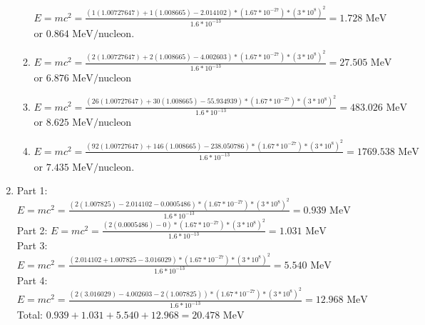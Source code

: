 \documentclass{article}
\begin{document}
\begin{enumerate}
\begin{enumerate}
        $E=mc^2 = \frac{(1(1.00727647)+1(1.008665)-2.014102)*(1.67*10^{-27})*(3*10^8)^2}{1.6*10^{-13}} = 1.728 \text{ MeV}$ or $0.864\text{ MeV}/$nucleon.
        
        \item
        
        $E=mc^2 = \frac{(2(1.00727647)+2(1.008665)-4.002603)*(1.67*10^{-27})*(3*10^8)^2}{1.6*10^{-13}} = 27.505\text{ MeV}$ or $6.876\text{ MeV}/$nucleon
        
        \item
        
        $E=mc^2 = \frac{(26(1.00727647)+30(1.008665)-55.934939)*(1.67*10^{-27})*(3*10^8)^2}{1.6*10^{-13}} = 483.026\text{ MeV}$ or $8.625\text{ MeV}/$nucleon
        
        \item
        
        $E=mc^2 = \frac{(92(1.00727647)+146(1.008665)-238.050786)*(1.67*10^{-27})*(3*10^8)^2}{1.6*10^{-13}} = 1769.538\text{ MeV}$ or $7.435\text{ MeV}/$nucleon.
        
    \end{enumerate}
    
    \item
    
    Part 1: $E=mc^2 = \frac{(2(1.007825)-2.014102-0.0005486)*(1.67*10^{-27})*(3*10^8)^2}{1.6*10^{-13}} = 0.939\text{ MeV}$\\
    Part 2: $E=mc^2 = \frac{(2(0.0005486)-0)*(1.67*10^{-27})*(3*10^8)^2}{1.6*10^{-13}} = 1.031 \text{ MeV}$\\
    Part 3: $E=mc^2 = \frac{(2.014102+1.007825-3.016029)*(1.67*10^{-27})*(3*10^8)^2}{1.6*10^{-13}} = 5.540 \text{ MeV}$\\
    Part 4: $E=mc^2 = \frac{(2(3.016029)-4.002603-2(1.007825))*(1.67*10^{-27})*(3*10^8)^2}{1.6*10^{-13}} = 12.968\text{ MeV}$\\
    Total: $0.939+1.031+5.540+12.968 = 20.478\text{ MeV}$
    
\end{enumerate}
\end{document}
